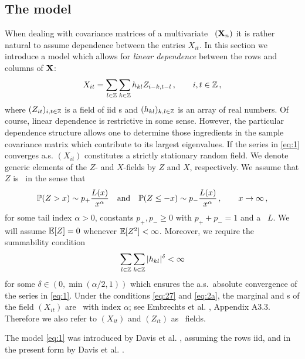 \subsection{The model}
When dealing with covariance matrices of a multivariate \ts\ $({\mathbf X}_n)$ it is rather natural to assume dependence
between the entries $X_{it}$.
In this section we introduce a model which allows for {\em linear dependence}
between the rows and columns of ${\mathbf X}$:
\begin{equation}\label{eq:1}
X_{it}=\sum_{l\in \mathbb{Z}}\sum_{k\in \mathbb{Z}} h_{kl} Z_{i-k,t-l}\,,\qquad i,t\in\mathbb{Z}\,,
\end{equation}
where $(Z_{it})_{i,t\in \mathbb{Z}}$ is a field of iid \rv s and $(h_{kl})_{k,l\in\mathbb{Z}}$ is an array of real numbers.
Of course, linear dependence is restrictive in some sense. However, the particular dependence structure allows one to
determine those ingredients in the sample covariance matrix which contribute to its largest eigenvalues.
If the series in \eqref{eq:1} converges a.s. $(X_{it})$ constitutes a strictly stationary random field.
We denote generic elements of the $Z$- and $X$-fields by $Z$ and $X$, respectively. We assume that $Z$ is \regvary\ in the sense that
\begin{equation}\label{eq:27}
\mathbb{P}(Z>x)\sim p_+ \dfrac{L(x)}{x^{\alpha}}\quad\mbox{and}\quad  \mathbb{P}(Z\le -x)\sim p_-
\dfrac{L(x)}{x^{\alpha}}\,,\qquad x \to \infty\,,
\end{equation}
for some tail index $\alpha>0$, constants $p_+,p_-\ge 0$ with $p_++p_-=1$ and a \slvary\ $L$. We will assume $\mathbb{E}[ Z]=0$ whenever $\mathbb{E} [Z^2]<\infty$.
Moreover, we require the summability condition
\begin{equation}\label{eq:2a}
\sum_{l \in \mathbb{Z}} \sum_{k\in \mathbb{Z}} |h_{kl}|^{\delta} <\infty
\end{equation}
for some $\delta\in (0,\min({\alpha/2},1))$ which ensures
the a.s.~absolute convergence of the series in \eqref{eq:1}. Under the conditions \eqref{eq:27} and \eqref{eq:2a}, the marginal and
\fidi s of the field $(X_{it})$ are \regvary\ with index $\alpha$; see
Embrechts et al. \cite{embrechts:klueppelberg:mikosch:1997}, Appendix A3.3. Therefore we also refer to $(X_{it})$ and $(Z_{it})$
as \regvary\ fields.
\par
The model \eqref{eq:1} was introduced by Davis et al. \cite{davis:pfaffel:stelzer:2014}, assuming the rows iid, and in the
present form by Davis et al. \cite{davis:mikosch:pfaffel:2015}.
